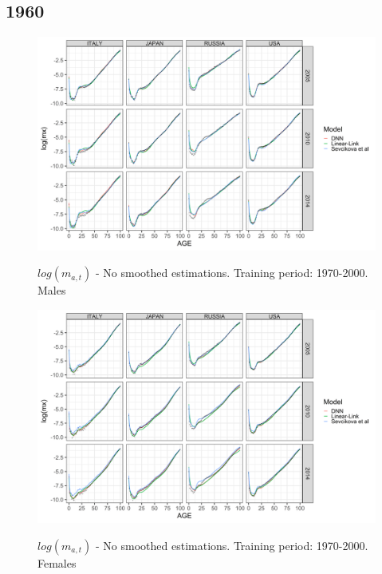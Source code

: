 \documentclass[a4,11pt]{article}
\begin{document}
\subsection{1960}

\begin{figure}[H]
	\centering
	\includegraphics[width=1\linewidth]{NO_S_age_pattern_M_1970}\\
	\caption{$log(m_{a,t})$ - No smoothed estimations. Training period: 1970-2000. Males} 
\end{figure}

\begin{figure}[H]
	\centering
	\includegraphics[width=1\linewidth]{NO_S_age_pattern_F_1970}\\
	\caption{$log(m_{a,t})$ - No smoothed estimations. Training period: 1970-2000. Females} 
\end{figure}
\end{document}
